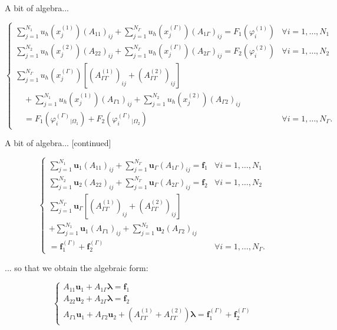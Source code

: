 \documentclass[11pt]{book}
\begin{document}
A bit of algebra...

$$
\begin{cases}\sum_{j=1}^{N_{1}} u_{h}\left(x_{j}^{(1)}\right)\left(A_{11}\right)_{i j}+\sum_{j=1}^{N_{\Gamma}} u_{h}\left(x_{j}^{(\Gamma)}\right)\left(A_{1 \Gamma}\right)_{i j}=F_{1}\left(\varphi_{i}^{(1)}\right) & \forall i=1, \ldots, N_{1} \\ \sum_{j=1}^{N_{2}} u_{h}\left(x_{j}^{(2)}\right)\left(A_{22}\right)_{i j}+\sum_{j=1}^{N_{\Gamma}} u_{h}\left(x_{j}^{(\Gamma)}\right)\left(A_{2 \Gamma}\right)_{i j}=F_{2}\left(\varphi_{i}^{(2)}\right) & \forall i=1, \ldots, N_{2} \\ \sum_{j=1}^{N_{\Gamma}} u_{h}\left(x_{j}^{(\Gamma)}\right)\left[\left(A_{\Gamma \Gamma}^{(1)}\right)_{i j}+\left(A_{\Gamma \Gamma}^{(2)}\right)_{i j}\right] & \\ \quad+\sum_{j=1}^{N_{1}} u_{h}\left(x_{j}^{(1)}\right)\left(A_{\Gamma 1}\right)_{i j}+\sum_{j=1}^{N_{2}} u_{h}\left(x_{j}^{(2)}\right)\left(A_{\Gamma 2}\right)_{i j} & \\ \quad=F_{1}\left(\varphi_{i}^{(\Gamma)}_{\mid \Omega_{1}}\right)+F_{2}\left(\varphi_{i}^{(\Gamma)}_{\mid \Omega_{2}}\right) & \forall i=1, \ldots, N_{\Gamma} .\end{cases}
$$

A bit of algebra... [continued]

$$
\left\{\begin{aligned}
\sum_{j=1}^{N_{1}} \mathbf{u}_{1}\left(A_{11}\right)_{i j}+\sum_{j=1}^{N_{\Gamma}} \mathbf{u}_{\Gamma}\left(A_{1 \Gamma}\right)_{i j}=\mathbf{f}_{1} & \forall i=1, \ldots, N_{1} \\
\sum_{j=1}^{N_{2}} \mathbf{u}_{2}\left(A_{22}\right)_{i j}+\sum_{j=1}^{N_{\Gamma}} \mathbf{u}_{\Gamma}\left(A_{2 \Gamma}\right)_{i j}=\mathbf{f}_{2} & \forall i=1, \ldots, N_{2} \\
\sum_{j=1}^{N_{\Gamma}} \mathbf{u}_{\Gamma}\left[\left(A_{\Gamma \Gamma}^{(1)}\right)_{i j}+\left(A_{\Gamma \Gamma}^{(2)}\right)_{i j}\right] & \\
+\sum_{j=1}^{N_{1}} \mathbf{u}_{1}\left(A_{\Gamma 1}\right)_{i j}+\sum_{j=1}^{N_{2}} \mathbf{u}_{2}\left(A_{\Gamma 2}\right)_{i j} & \\
=\mathbf{f}_{1}^{(\Gamma)}+\mathbf{f}_{2}^{(\Gamma)} & \forall i=1, \ldots, N_{\Gamma} .
\end{aligned}\right.
$$

... so that we obtain the algebraic form:

$$
\left\{\begin{array}{l}
A_{11} \mathbf{u}_{1}+A_{1 \Gamma} \boldsymbol{\lambda}=\mathbf{f}_{1} \\
A_{22} \mathbf{u}_{2}+A_{2 \Gamma} \boldsymbol{\lambda}=\mathbf{f}_{2} \\
A_{\Gamma 1} \mathbf{u}_{1}+A_{\Gamma 2} \mathbf{u}_{2}+\left(A_{\Gamma \Gamma}^{(1)}+A_{\Gamma \Gamma}^{(2)}\right) \boldsymbol{\lambda}=\mathbf{f}_{1}^{(\Gamma)}+\mathbf{f}_{2}^{(\Gamma)}
\end{array}\right.
$$
\end{document}
